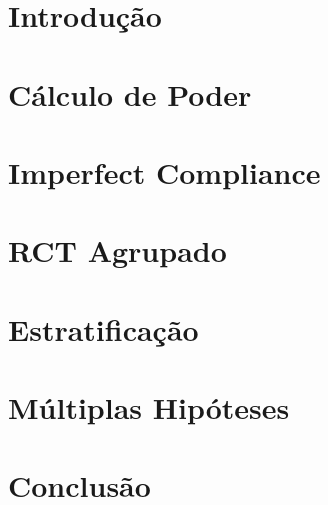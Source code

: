 \documentclass[12pt, a4paper, openany]{book}
\numberwithin{equation}{chapter}
\numberwithin{table}{chapter}
\numberwithin{figure}{chapter}
\begin{document}
\mainmatter

\chapter{Introdução}\label{introducao}



\chapter{Cálculo de Poder}\label{poder}



\chapter{Imperfect Compliance}\label{late}



\chapter{RCT Agrupado}\label{cluster}



\chapter{Estratificação}\label{strat}



\chapter{Múltiplas Hipóteses}\label{multihip}



\chapter{Conclusão}\label{conclusao}




\backmatter
\setlength\bibsep{0pt}

\end{document}
